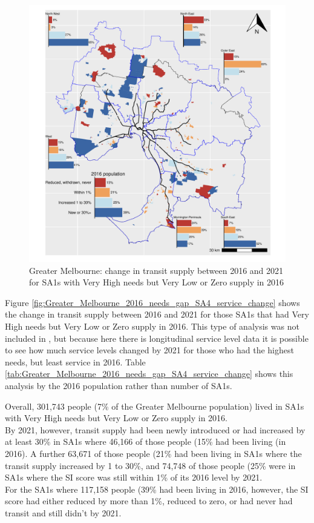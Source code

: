 \documentclass[preprint, 3p,
authoryear]{elsarticle} %
\begin{document}
\begin{figure}
\centering
\includegraphics{ReynoldsCurrieQu2024_files/figure-latex/Greater_Melbourne_2016_needs_gap_SA4_service_change-1.pdf}
\caption{Greater Melbourne: change in transit supply between 2016 and
2021 for SA1s with Very High needs but Very Low or Zero supply in 2016}
\end{figure}

Figure \ref{fig:Greater_Melbourne_2016_needs_gap_SA4_service_change}
shows the change in transit supply between 2016 and 2021 for those SA1s
that had Very High needs but Very Low or Zero supply in 2016. This type
of analysis was not included in \citet{currie2010identifying}, but
because here there is longitudinal service level data it is possible to
see how much service levels changed by 2021 for those who had the
highest needs, but least service in 2016. Table
\ref{tab:Greater_Melbourne_2016_needs_gap_SA4_service_change} shows this
analysis by the 2016 population rather than number of SA1s.

Overall, 301,743 people (7\% of the Greater Melbourne population) lived
in SA1s with Very High needs but Very Low or Zero supply in 2016.\\
By 2021, however, transit supply had been newly introduced or had
increased by at least 30\% in SA1s where 46,166 of those people (15\%
had been living (in 2016). A further 63,671 of those people (21\% had
been living in SA1s where the transit supply increased by 1 to 30\%, and
74,748 of those people (25\% were in SA1s where the SI score was still
within 1\% of its 2016 level by 2021.\\
For the SA1s where 117,158 people (39\% had been living in 2016,
however, the SI score had either reduced by more than 1\%, reduced to
zero, or had never had transit and still didn't by 2021.
\end{document}
